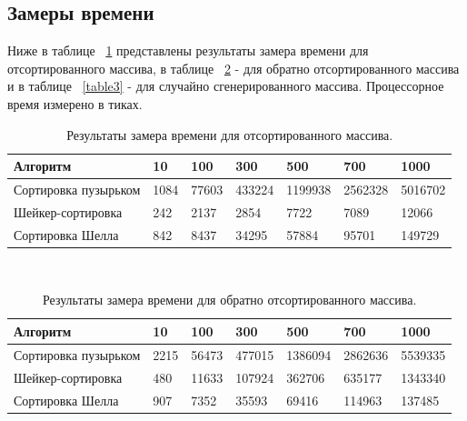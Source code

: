\documentclass[a4paper]{article}
\begin{document}
	\subsection {Замеры времени}
	Ниже в таблице ~\ref{table1} представлены результаты замера времени для отсортированного массива, в таблице ~\ref{table2} - для обратно отсортированного массива и в таблице ~\ref{table3} - для случайно сгенерированного массива. Процессорное время измерено в тиках.
	\begin{table}[h]
		\caption{\label{table1} Результаты замера времени для отсортированного массива.}
		\begin{center}
			\begin{tabular}{|p{150pt}|p{40pt}|p{50pt}|p{50pt}|p{50pt}|p{50pt} |p{50pt}|}
				\hline
				\textbf{Алгоритм} & \textbf{10}&\textbf{100} & \textbf{300} &\textbf{500} & \textbf{700} & \textbf{1000}\\ \hline
				Сортировка пузырьком & 1084 & 77603 & 433224  & 1199938 &2562328 & 5016702\\	\hline
				Шейкер-сортировка & 242 &2137 & 2854 & 7722 & 7089 & 12066\\ \hline
				Сортировка Шелла & 842 &8437 & 34295 & 57884 & 95701 & 149729\\ \hline
			\end{tabular}
		\end{center}
	\end{table}\\
	\begin{table}[h]
	\caption{\label{table2} Результаты замера времени для обратно отсортированного массива.}
	\begin{center}
		\begin{tabular}{|p{150pt}|p{40pt}|p{50pt}|p{50pt}|p{50pt}|p{50pt} |p{50pt}|}
			\hline
			\textbf{Алгоритм} & \textbf{10} &\textbf{100} & \textbf{300} &\textbf{500} & \textbf{700} & \textbf{1000}\\ \hline
			Сортировка пузырьком &2215&56473 & 477015  & 1386094 & 2862636 & 5539335 \\	\hline
			Шейкер-сортировка &480& 11633 &107924 & 362706 & 635177 &  1343340\\ \hline
			Сортировка Шелла &907&7352 & 35593 & 69416 &114963 & 137485\\ \hline
		\end{tabular}
	\end{center}
\end{table}\\
\end{document}
